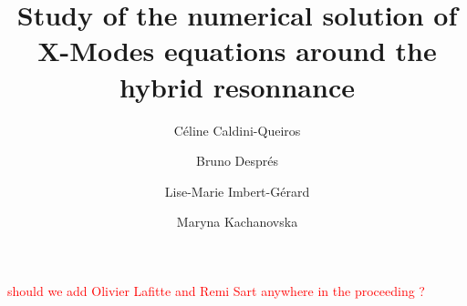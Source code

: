 \documentclass[proc]{edpsmath}
\begin{document}
\newcommand{\urev}[1]{{\color{red}#1}}
\newcommand{\mrev}[1]{{\color{blue}#1}}

\title{Study of the
	numerical solution of X-Modes equations around the hybrid resonnance} %
%
\author{C\'eline Caldini-Queiros}\address{Max Planck Institute für PlasmaPhysik, Garching bei Muenchen}
\author{Bruno Despr\'es}\address{Laboratoire Jacques-Louis Lions, University PARIS 6}
\author{Lise-Marie Imbert-Gérard}\address{Courant Institute of Mathematical Sciences, New York University}
\author{Maryna Kachanovska}\address{POEMS, INRIA, ENSTA ParisTech, Paris}


%
%
\begin{abstract}

\end{abstract}
%
\begin{resume} 

\end{resume}
%
%
\maketitle
\textcolor{red}{should we add Olivier Lafitte and Remi Sart anywhere in the proceeding ?}\\


%





\end{document}
